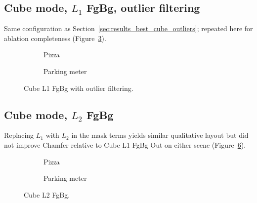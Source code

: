 \subsection{Cube mode, $L_1$ FgBg, outlier filtering}
\label{subsec:ablation_cube_l1_fgbg_outliers}

Same configuration as Section~\ref{sec:results_best_cube_outliers}; repeated here for ablation completeness (Figure~\ref{fig:ablation_cube_l1_fgbg_out}).

\begin{figure}[H]
    \centering
    \begin{subfigure}{\textwidth}
        \centering
        \caption{Pizza}
        \label{fig:ablation_cube_l1_fgbg_out_pizza}
    \end{subfigure}
    \vspace{0.6em}
    \begin{subfigure}{\textwidth}
        \centering
        \caption{Parking meter}
        \label{fig:ablation_cube_l1_fgbg_out_parking}
    \end{subfigure}
    \caption{Cube L1 FgBg with outlier filtering.}
    \label{fig:ablation_cube_l1_fgbg_out}
\end{figure}

\subsection{Cube mode, $L_2$ FgBg}
\label{subsec:ablation_cube_l2_fgbg}

Replacing $L_1$ with $L_2$ in the mask terms yields similar qualitative layout but did not improve Chamfer relative to Cube L1 FgBg Out on either scene (Figure~\ref{fig:ablation_cube_l2}).

\begin{figure}[H]
    \centering
    \begin{subfigure}{\textwidth}
        \centering
        \caption{Pizza}
        \label{fig:ablation_cube_l2_pizza}
    \end{subfigure}
    \vspace{0.6em}
    \begin{subfigure}{\textwidth}
        \centering
        \caption{Parking meter}
        \label{fig:ablation_cube_l2_parking}
    \end{subfigure}
    \caption{Cube L2 FgBg.}
    \label{fig:ablation_cube_l2}
\end{figure}

